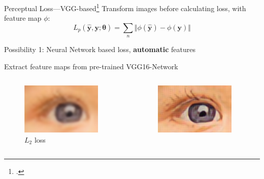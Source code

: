 \documentclass{beamer}
\begin{document}
\begin{frame}{Perceptual Loss---VGG-based\footcite{PerceptualLoss}}
Transform images before calculating loss, with feature map $\phi$:
\begin{equation*}
    L_p( \hat{\bm{y}}, \bm{y}; \bm{\theta}) = \sum_n \Vert \phi( \bm{\hat{y}} ) - \phi( \bm{y}) \Vert
\end{equation*}

  \alert{Possibility 1}: Neural Network based loss, \textbf{automatic} features

  Extract feature maps from pre-trained VGG16-Network
\begin{columns}
  \begin{column}{0.33\linewidth}
    \begin{figure}[h]
      \centering
        \includegraphics[width=0.9\textwidth]{perceptual_loss_l2}
      \caption*{$L_2$ loss}
    \end{figure}
  \end{column}
  \begin{column}{0.33\linewidth}
    \begin{figure}[h]
      \centering
        \includegraphics[width=0.9\textwidth]{perceptual_loss_vgg}

\end{figure}
\end{column}
\end{columns}
\end{frame}
\end{document}
